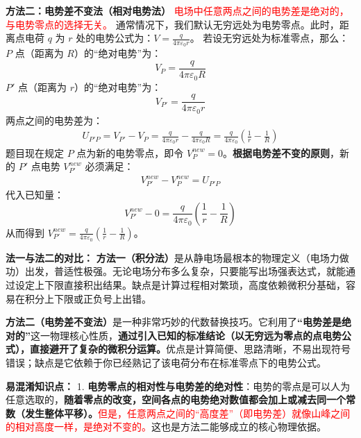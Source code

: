 \textbf{方法二：电势差不变法（相对电势法）}
\textcolor{red}{电场中任意两点之间的电势差是绝对的，与电势零点的选择无关。}
通常情况下，我们默认无穷远处为电势零点。此时，距离点电荷 $q$ 为 $r$ 处的电势公式为：$V = \frac{q}{4\pi\varepsilon_0 r}$。
若设无穷远处为标准零点，那么：
$P$ 点（距离为 $R$）的“绝对电势”为：
\begin{equation}\label{eq:7-13-3}
	V_P = \frac{q}{4\pi\varepsilon_0 R}
\end{equation}
$P'$ 点（距离为 $r$）的“绝对电势”为：
\begin{equation}\label{eq:7-13-4}
	V_{P'} = \frac{q}{4\pi\varepsilon_0 r}
\end{equation}
两点之间的电势差为：
\begin{align*}
	U_{P'P} = V_{P'} - V_P = \frac{q}{4\pi\varepsilon_0 r} - \frac{q}{4\pi\varepsilon_0 R} = \frac{q}{4\pi\varepsilon_0} \left( \frac{1}{r} - \frac{1}{R} \right)
\end{align*}
题目现在规定 $P$ 点为新的电势零点，即令 $V_P^{new} = 0$。\textbf{根据电势差不变的原则}，新的 $P'$ 点电势 $V_{P'}^{new}$ 必须满足：
\begin{align*}
	V_{P'}^{new} - V_P^{new} = U_{P'P}
\end{align*}
代入已知量：
\begin{equation}\label{eq:7-13-5}
	V_{P'}^{new} - 0 = \frac{q}{4\pi\varepsilon_0} \left( \frac{1}{r} - \frac{1}{R} \right)
\end{equation}
从而得到 $V_{P'}^{new} = \frac{q}{4\pi\varepsilon_0} \left( \frac{1}{r} - \frac{1}{R} \right)$。

\textbf{法一与法二的对比：}
 \textbf{方法一（积分法）}是从静电场最根本的物理定义（电场力做功）出发，普适性极强。无论电场分布多么复杂，只要能写出场强表达式，就能通过设定上下限直接积出结果。缺点是计算过程相对繁琐，高度依赖微积分基础，容易在积分上下限或正负号上出错。
 
 \textbf{方法二（电势差不变法）}是一种非常巧妙的代数替换技巧。它利用了\textbf{“电势差是绝对的”}这一物理核心性质，\textbf{通过引入已知的标准结论（以无穷远为零点的点电势公式），直接避开了复杂的微积分运算。}优点是计算简便、思路清晰，不易出现符号错误；缺点是它依赖于你已经熟记了该电荷分布在标准零点下的电势公式。

\textbf{易混淆知识点： }
1. \textbf{电势零点的相对性与电势差的绝对性}：电势的零点是可以人为任意选取的，\textbf{随着零点的改变，空间各点的电势绝对数值都会加上或减去同一个常数（发生整体平移）。}\textcolor{red}{但是，任意两点之间的“高度差”（即电势差）就像山峰之间的相对高度一样，是绝对不变的。}这也是方法二能够成立的核心物理依据。

